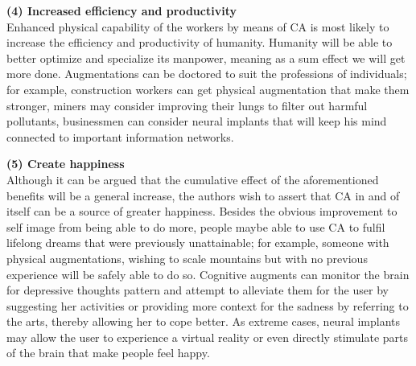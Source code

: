 {\bf (4) Increased efficiency and productivity} \\
Enhanced physical capability of the workers by means of CA is most likely to increase the efficiency and productivity of humanity. Humanity will be able to better optimize and specialize its manpower, meaning as a sum effect we will get more done. Augmentations can be doctored to suit the professions of individuals; for example, construction workers can get physical augmentation that make them stronger, miners may consider improving their lungs to filter out harmful pollutants, businessmen can consider neural implants that will keep his mind connected to important information networks.

{\bf (5) Create happiness} \\
Although it can be argued that the cumulative effect of the aforementioned benefits will be a general increase, the authors wish to assert that CA in and of itself can be a source of greater happiness. Besides the obvious improvement to self image from being able to do more, people maybe able to use CA to fulfil lifelong dreams that were previously unattainable; for example, someone with physical augmentations, wishing to scale mountains but with no previous experience will be safely able to do so. Cognitive augments can monitor the brain for depressive thoughts pattern and attempt to alleviate them for the user by suggesting her activities or providing more context for the sadness by referring to the arts, thereby allowing her to cope better. As extreme cases, neural implants may allow the user to experience a virtual reality or even directly stimulate parts of the brain that make people feel happy.



